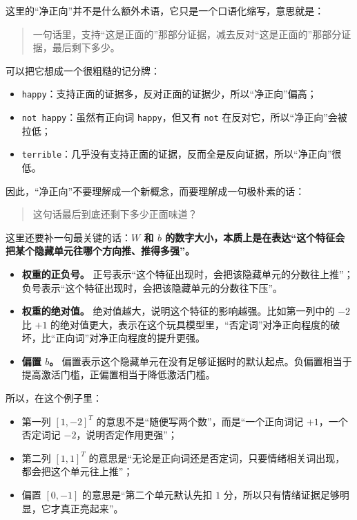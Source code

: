 \documentclass[12pt,a4paper]{ctexart}
\begin{document}
这里的“净正向”并不是什么额外术语，它只是一个口语化缩写，意思就是：
\begin{quote}
一句话里，支持“这是正面的”那部分证据，减去反对“这是正面的”那部分证据，最后剩下多少。
\end{quote}

可以把它想成一个很粗糙的记分牌：
\begin{itemize}
  \item \texttt{happy}：支持正面的证据多，反对正面的证据少，所以“净正向”偏高；
  \item \texttt{not happy}：虽然有正向词 \texttt{happy}，但又有 \texttt{not} 在反对它，所以“净正向”会被拉低；
  \item \texttt{terrible}：几乎没有支持正面的证据，反而全是反向证据，所以“净正向”很低。
\end{itemize}

因此，“净正向”不要理解成一个新概念，而要理解成一句极朴素的话：
\begin{quote}
这句话最后到底还剩下多少正面味道？
\end{quote}

这里还要补一句最关键的话：\textbf{\(W\) 和 \(b\) 的数字大小，本质上是在表达“这个特征会把某个隐藏单元往哪个方向推、推得多强”。}

\begin{itemize}
  \item \textbf{权重的正负号。} 正号表示“这个特征出现时，会把该隐藏单元的分数往上推”；负号表示“这个特征出现时，会把该隐藏单元的分数往下压”。
  \item \textbf{权重的绝对值。} 绝对值越大，说明这个特征的影响越强。比如第一列中的 \(-2\) 比 \(+1\) 的绝对值更大，表示在这个玩具模型里，“否定词”对净正向程度的破坏，比“正向词”对净正向程度的提升更强。
  \item \textbf{偏置 \(b\)。} 偏置表示这个隐藏单元在没有足够证据时的默认起点。负偏置相当于提高激活门槛，正偏置相当于降低激活门槛。
\end{itemize}

所以，在这个例子里：
\begin{itemize}
  \item 第一列 \([1,-2]^T\) 的意思不是“随便写两个数”，而是“一个正向词记 \(+1\)，一个否定词记 \(-2\)，说明否定作用更强”；
  \item 第二列 \([1,1]^T\) 的意思是“无论是正向词还是否定词，只要情绪相关词出现，都会把这个单元往上推”；
  \item 偏置 \([0,-1]\) 的意思是“第二个单元默认先扣 \(1\) 分，所以只有情绪证据足够明显，它才真正亮起来”。
\end{itemize}
\end{document}
